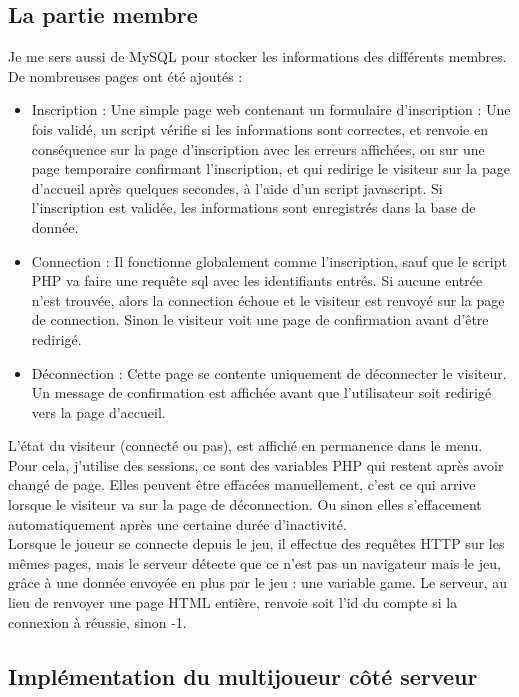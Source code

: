 \documentclass[12pt]{article}
\begin{document}
\subsection{La partie membre}

Je me sers aussi de MySQL pour stocker les informations des différents membres. De nombreuses pages ont été ajoutés :
\begin{itemize}
\item Inscription : Une simple page web contenant un formulaire d'inscription : Une fois validé, un script vérifie si les informations sont correctes, et renvoie en conséquence sur la page d'inscription avec les erreurs affichées, ou sur une page temporaire confirmant l'inscription, et qui redirige le visiteur sur la page d'accueil après quelques secondes, à l'aide d'un script javascript. Si l'inscription est validée, les informations sont enregistrés dans la base de donnée.
\item Connection : Il fonctionne globalement comme l'inscription, sauf que le script PHP va faire une requête sql avec les identifiants entrés. Si aucune entrée n'est trouvée, alors la connection échoue et le visiteur est renvoyé sur la page de connection. Sinon le visiteur voit une page de confirmation avant d'être redirigé.
\item Déconnection : Cette page se contente uniquement de déconnecter le visiteur. Un message de confirmation est affichée avant que l'utilisateur soit redirigé vers la page d'accueil.
\end{itemize}

L'état du visiteur (connecté ou pas), est affiché en permanence dans le menu. Pour cela, j'utilise des sessions, ce sont des variables PHP qui restent après avoir changé de page. Elles peuvent être effacées manuellement, c'est ce qui arrive lorsque le visiteur va sur la page de déconnection. Ou sinon elles s'effacement automatiquement après une certaine durée d'inactivité.\\

Lorsque le joueur se connecte depuis le jeu, il effectue des requêtes HTTP sur les mêmes pages, mais le serveur détecte que ce n'est pas un navigateur mais le jeu, grâce à une donnée envoyée en plus par le jeu : une variable game. Le serveur, au lieu de renvoyer une page HTML entière, renvoie soit l'id du compte si la connexion à réussie, sinon -1.

\subsection{Implémentation du multijoueur côté serveur}
\end{document}

